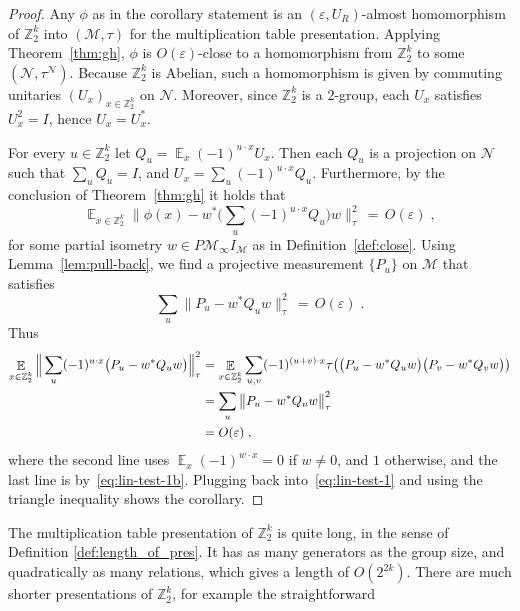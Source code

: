 \documentclass[11pt]{article}
\theoremstyle{definition}
\newcommand{\Id}{\ensuremath{I}}
\DeclareMathOperator*{\Expectation}{\mathbb{E}}
\newcommand{\Es}[1]{\Expectation_{#1}}
\newcommand{\Z}{\ensuremath{\mathbb{Z}}}
\newcommand{\mM}{\ensuremath{\mathcal{M}}}
\newcommand{\eps}{\varepsilon}
\newcommand{\mN}{\mathcal{N}}
\begin{document}
\begin{proof}
Any $\phi$ as in the corollary statement is an $(\eps,U_R)$-almost homomorphism of $\Z_2^k$ into $(\mM,\tau)$ for the multiplication table presentation. Applying Theorem~\ref{thm:gh}, $\phi$ is $O(\eps)$-close to a homomorphism from $\Z_2^k$ to some $(\mN,\tau^\mN)$. Because $\Z_2^k$ is Abelian, such a homomorphism is given by commuting unitaries $(U_x)_{x\in\Z_2^k}$ on $\mN$. Moreover, since $\Z_2^k$ is a $2$-group, each $U_x$ satisfies $U_x^2=\Id$, hence $U_x=U_x^*$.

For every $u\in  \Z_2^k$ let $Q_u = \Es{x} (-1)^{u\cdot x} U_x$. Then each $Q_u$ is a projection on $\mN$ such that $\sum_u Q_u=\Id$, and $U_x = \sum_u (-1)^{u\cdot x} Q_u$. Furthermore, by the conclusion of Theorem~\ref{thm:gh} it holds that 
\begin{equation}\label{eq:lin-test-1}
   \Es{x\in \Z_2^k} \Big\| \phi(x) - w^*\Big(\sum_u (-1)^{u\cdot x} Q_u\Big)w  \Big\|_{\tau}^2 \,=\, O(\eps)\;,
\end{equation}
for some partial isometry $w\in P\mM_\infty I_\mM$ as in Definition~\ref{def:close}.
Using Lemma~\ref{lem:pull-back}, we find a projective measurement $\{P_u\}$ on $\mM$ that satisfies 
\begin{equation}\label{eq:lin-test-1b}
 \sum_u \big\| P_u - w^* Q_u w \big\|_\tau^2 \,=\, O(\eps)\;.
\end{equation}
Thus
\begin{align}
\Es{x\in \Z_2^k}  \Big\| \sum_u (-1)^{u\cdot x} \big(P_u - w^* Q_u w\big) \Big\|_\tau^2
&=\Es{x\in \Z_2^k} \sum_{u,v} (-1)^{(u+v)\cdot x} \tau\big(\big(P_u - w^* Q_u w\big)\big(P_v - w^* Q_v w\big)\big) \notag\\
&= \sum_u \big\| P_u - w^* Q_u w\big\|_\tau^2\notag\\
&= O(\eps)\;,\label{eq:lin-test-2}
\end{align}
where the second line uses $\Es{x} (-1)^{w\cdot x} = 0$ if $w\neq 0$, and $1$ otherwise, and the last line is by~\eqref{eq:lin-test-1b}. Plugging back into~\eqref{eq:lin-test-1} and using the triangle inequality shows the corollary.  
\end{proof}

The multiplication table presentation of $\Z_2^k$ is quite long,  in the sense of Definition \ref{def:length_of_pres}. It has as many generators as the group size, and quadratically as many relations, which gives a length of $O(2^{2k})$. 
There are much shorter presentations of $\Z_2^k$, for example the straightforward
\end{document}
